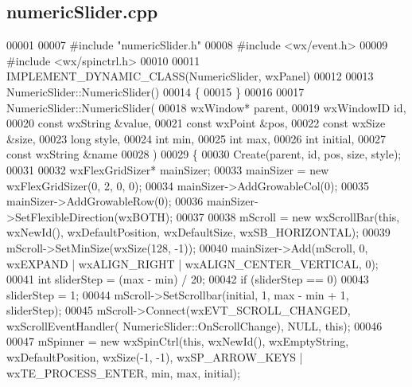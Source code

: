 \subsection{numeric\+Slider.\+cpp}
\label{numericSlider_8cpp_source}

\begin{DoxyCode}
00001 
00007 \textcolor{preprocessor}{#include "numericSlider.h"}
00008 \textcolor{preprocessor}{#include <wx/event.h>}
00009 \textcolor{preprocessor}{#include <wx/spinctrl.h>}
00010 
00011 IMPLEMENT\_DYNAMIC\_CLASS(NumericSlider, wxPanel)
00012 
00013 NumericSlider::NumericSlider()
00014 \{
00015 \}
00016 
00017 NumericSlider::NumericSlider(
00018         wxWindow* parent,
00019         wxWindowID \textcolor{keywordtype}{id},
00020         \textcolor{keyword}{const} wxString &value,
00021         \textcolor{keyword}{const} wxPoint &pos,
00022         \textcolor{keyword}{const} wxSize &size,
00023         \textcolor{keywordtype}{long} style,
00024         \textcolor{keywordtype}{int} min,
00025         \textcolor{keywordtype}{int} max,
00026         \textcolor{keywordtype}{int} initial,
00027         \textcolor{keyword}{const} wxString &name
00028     )
00029 \{
00030     Create(parent, \textcolor{keywordtype}{id}, pos, size, style);
00031 
00032     wxFlexGridSizer* mainSizer;
00033     mainSizer = \textcolor{keyword}{new} wxFlexGridSizer(0, 2, 0, 0);
00034     mainSizer->AddGrowableCol(0);
00035     mainSizer->AddGrowableRow(0);
00036     mainSizer->SetFlexibleDirection(wxBOTH);
00037 
00038     mScroll = \textcolor{keyword}{new} wxScrollBar(\textcolor{keyword}{this}, wxNewId(), wxDefaultPosition, wxDefaultSize, wxSB\_HORIZONTAL);
00039     mScroll->SetMinSize(wxSize(128, -1));
00040     mainSizer->Add(mScroll, 0, wxEXPAND | wxALIGN\_RIGHT | wxALIGN\_CENTER\_VERTICAL, 0);
00041     \textcolor{keywordtype}{int} sliderStep = (max - min) / 20;
00042     \textcolor{keywordflow}{if} (sliderStep == 0)
00043         sliderStep = 1;
00044     mScroll->SetScrollbar(initial, 1, max - min + 1, sliderStep);
00045     mScroll->Connect(wxEVT\_SCROLL\_CHANGED, wxScrollEventHandler(
      NumericSlider::OnScrollChange), NULL, \textcolor{keyword}{this});
00046 
00047     mSpinner = \textcolor{keyword}{new} wxSpinCtrl(\textcolor{keyword}{this}, wxNewId(), wxEmptyString, wxDefaultPosition, wxSize(-1, -1), 
      wxSP\_ARROW\_KEYS | wxTE\_PROCESS\_ENTER, min, max, initial);

\end{DoxyCode}
